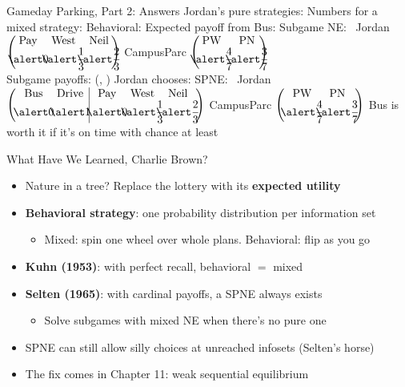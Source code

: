 \begin{frame}{Gameday Parking, Part 2: Answers}
\small
Jordan's pure strategies:  \quad Numbers for a mixed strategy:  \quad Behavioral: 
\bsk
Expected payoff from Bus: 
\bsk
Subgame NE: \ Jordan $\begin{pmatrix}\text{Pay} & \text{West} & \text{Neil}\\ \ans{0.3in}{$0$} & \ans{0.3in}{$\dfrac13$} & \ans{0.3in}{$\dfrac23$}\end{pmatrix}$
\quad CampusParc $\begin{pmatrix}\text{PW} & \text{PN}\\ \ans{0.3in}{$\dfrac47$} & \ans{0.3in}{$\dfrac37$}\end{pmatrix}$
\\[6pt]
Subgame payoffs: (, ) \qquad Jordan chooses: 
\bsk
SPNE: \ Jordan $\beh[cc|ccc]{\text{Bus} & \text{Drive} & \text{Pay} & \text{West} & \text{Neil}}{\ans{0.3in}{$0$} & \ans{0.3in}{$1$} & \ans{0.3in}{$0$} & \ans{0.3in}{$\dfrac13$} & \ans{0.3in}{$\dfrac23$}}$
\quad CampusParc $\beh{\text{PW} & \text{PN}}{\ans{0.3in}{$\dfrac47$} & \ans{0.3in}{$\dfrac37$}}$
\bsk
Bus is worth it if it's on time with chance at least 
\vspace{-0.3in}
\end{frame}

\begin{frame}{What Have We Learned, Charlie Brown?}
\begin{itemize}
    \item Nature in a tree? Replace the lottery with its \textbf{expected utility}
    \item \textbf{Behavioral strategy}: one probability distribution per information set
    \begin{itemize}
        \item Mixed: spin one wheel over whole plans. Behavioral: flip as you go
    \end{itemize}
    \item \textbf{Kuhn (1953)}: with perfect recall, behavioral $=$ mixed
    \item \textbf{Selten (1965)}: with cardinal payoffs, a SPNE always exists
    \begin{itemize}
        \item Solve subgames with mixed NE when there's no pure one
    \end{itemize}
    \item SPNE can still allow silly choices at unreached infosets (Selten's horse)
    \item The fix comes in Chapter 11: weak sequential equilibrium
\end{itemize}
\vfill
\vspace{-0.4in}
\end{frame}

